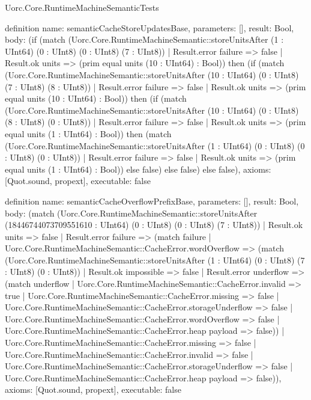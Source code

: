 \begin{lexlean}{Uorc.Core.RuntimeMachineSemanticTests}
\begin{semanticmodule}
definition{
  name: semanticCacheStoreUpdatesBase,
  parameters: [],
  result: Bool,
  body: (if (match (Uorc.Core.RuntimeMachineSemantic::storeUnitsAfter (1 : UInt64) (0 : UInt8) (0 : UInt8) (7 : UInt8))
    | Result.error failure => false
    | Result.ok units => (prim equal units (10 : UInt64) : Bool)) then (if (match (Uorc.Core.RuntimeMachineSemantic::storeUnitsAfter (10 : UInt64) (0 : UInt8) (7 : UInt8) (8 : UInt8))
    | Result.error failure => false
    | Result.ok units => (prim equal units (10 : UInt64) : Bool)) then (if (match (Uorc.Core.RuntimeMachineSemantic::storeUnitsAfter (10 : UInt64) (0 : UInt8) (8 : UInt8) (0 : UInt8))
    | Result.error failure => false
    | Result.ok units => (prim equal units (1 : UInt64) : Bool)) then (match (Uorc.Core.RuntimeMachineSemantic::storeUnitsAfter (1 : UInt64) (0 : UInt8) (0 : UInt8) (0 : UInt8))
    | Result.error failure => false
    | Result.ok units => (prim equal units (1 : UInt64) : Bool)) else false) else false) else false),
  axioms: [Quot.sound, propext],
  executable: false
}

definition{
  name: semanticCacheOverflowPrefixBase,
  parameters: [],
  result: Bool,
  body: (match (Uorc.Core.RuntimeMachineSemantic::storeUnitsAfter (18446744073709551610 : UInt64) (0 : UInt8) (0 : UInt8) (7 : UInt8))
    | Result.ok units => false
    | Result.error failure => (match failure
      | Uorc.Core.RuntimeMachineSemantic::CacheError.wordOverflow => (match (Uorc.Core.RuntimeMachineSemantic::storeUnitsAfter (1 : UInt64) (0 : UInt8) (7 : UInt8) (0 : UInt8))
        | Result.ok impossible => false
        | Result.error underflow => (match underflow
          | Uorc.Core.RuntimeMachineSemantic::CacheError.invalid => true
          | Uorc.Core.RuntimeMachineSemantic::CacheError.missing => false
          | Uorc.Core.RuntimeMachineSemantic::CacheError.storageUnderflow => false
          | Uorc.Core.RuntimeMachineSemantic::CacheError.wordOverflow => false
          | Uorc.Core.RuntimeMachineSemantic::CacheError.heap payload => false))
      | Uorc.Core.RuntimeMachineSemantic::CacheError.missing => false
      | Uorc.Core.RuntimeMachineSemantic::CacheError.invalid => false
      | Uorc.Core.RuntimeMachineSemantic::CacheError.storageUnderflow => false
      | Uorc.Core.RuntimeMachineSemantic::CacheError.heap payload => false)),
  axioms: [Quot.sound, propext],
  executable: false
}


\end{semanticmodule}
\end{lexlean}
